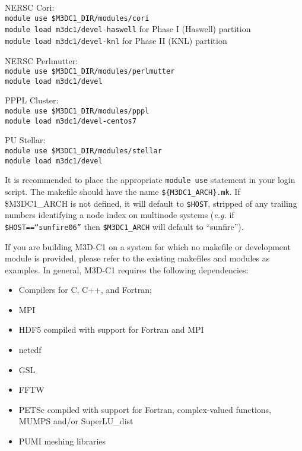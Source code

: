 \begin{description}
\item{NERSC Cori}:\\
  \texttt{module use \$M3DC1\_DIR/modules/cori}\\
  \texttt{module load m3dc1/devel-haswell}\quad
  for Phase I (Haswell) partition\\
  \texttt{module load m3dc1/devel-knl}\quad
  for Phase II (KNL) partition
\item{NERSC Perlmutter}:\\
  \texttt{module use \$M3DC1\_DIR/modules/perlmutter}\\
  \texttt{module load m3dc1/devel}
\item{PPPL Cluster}:\\
  \texttt{module use \$M3DC1\_DIR/modules/pppl}\\
  \texttt{module load m3dc1/devel-centos7}
\item{PU Stellar}:\\
  \texttt{module use \$M3DC1\_DIR/modules/stellar}\\
  \texttt{module load m3dc1/devel}
\end{description}

It is recommended to place the appropriate \texttt{module use}
statement in your login script.  The makefile should have the name
\texttt{\$\{M3DC1\_ARCH\}.mk}.  If \$M3DC1\_ARCH is not defined, it
will default to \texttt{\$HOST}, stripped of any trailing numbers
identifying a node index on multinode systems (\textit{e.g.} if
\texttt{\$HOST==``sunfire06''} then \texttt{\$M3DC1\_ARCH} will
default to ``sunfire'').

If you are building M3D-C1 on a system for which no makefile or development
module is provided, please refer to the existing makefiles and modules
as examples.  In general, M3D-C1 requires the following dependencies:
\begin{itemize}
\item Compilers for C, C++, and Fortran;
\item MPI
\item HDF5 compiled with support for Fortran and MPI
\item netcdf
\item GSL
\item FFTW
\item PETSc compiled with support for Fortran, complex-valued
  functions, MUMPS and/or SuperLU\_dist
\item PUMI meshing libraries
\end{itemize}

